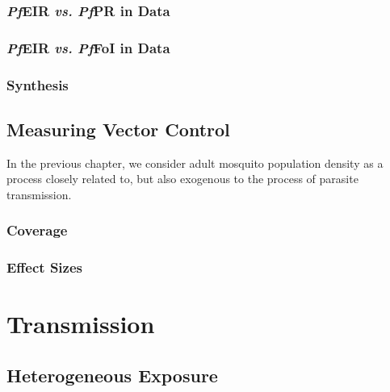 \documentclass[
]{book}
\begin{document}
\hypertarget{pfeir-vs.-pfpr-in-data}{%
\section{\texorpdfstring{\emph{Pf}EIR \emph{vs.} \emph{Pf}PR in Data}{PfEIR vs. PfPR in Data}}\label{pfeir-vs.-pfpr-in-data}}

\hypertarget{pfeir-vs.-pffoi-in-data}{%
\section{\texorpdfstring{\emph{Pf}EIR \emph{vs.} \emph{Pf}FoI in Data}{PfEIR vs. PfFoI in Data}}\label{pfeir-vs.-pffoi-in-data}}

\hypertarget{synthesis-1}{%
\section{Synthesis}\label{synthesis-1}}

\hypertarget{measuring-vector-control}{%
\chapter{Measuring Vector Control}\label{measuring-vector-control}}

In the previous chapter, we consider adult mosquito population density as a process closely related to, but also exogenous to the process of parasite transmission.

\hypertarget{coverage}{%
\section{Coverage}\label{coverage}}

\hypertarget{effect-sizes}{%
\section{Effect Sizes}\label{effect-sizes}}

\hypertarget{part-transmission}{%
\part{Transmission}\label{part-transmission}}

\hypertarget{heterogeneous-exposure}{%
\chapter{Heterogeneous Exposure}\label{heterogeneous-exposure}}
\end{document}
